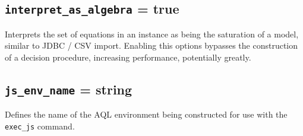 \documentclass[10pt]{book}
\begin{document}
\subsection{{\tt interpret\_as\_algebra} = true}

Interprets the set of equations in an instance as being the saturation of a model, similar to JDBC / CSV import.  Enabling this options bypasses the construction of a decision procedure, increasing performance, potentially greatly.

\subsection{{\tt js\_env\_name} = string}

Defines the name of the AQL environment being constructed for use with the {\tt exec\_js} command.
\end{document}
